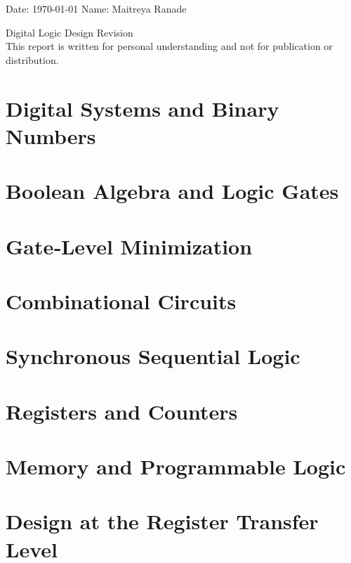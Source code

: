 \documentclass{report}
\begin{document}
\onehalfspacing
	Date: \today{} \hfill{} Name: Maitreya Ranade\\
	\begin{center}
		\vspace*{\fill}
		{\LARGE Digital Logic Design Revision} \\
		This report is written for personal understanding and not for publication or distribution.
		\vspace*{\fill}
	\end{center}
	
\pagebreak
\singlespacing
\tableofcontents
\pagebreak

\chapter{Digital Systems and Binary Numbers}
 \pagebreak

\chapter{Boolean Algebra and Logic Gates}
   \pagebreak

\chapter{Gate‐Level Minimization}
   \pagebreak

\chapter{Combinational Circuits}
   \pagebreak

\chapter{Synchronous Sequential Logic}
   \pagebreak

\chapter{Registers and Counters}
   \pagebreak

\chapter{Memory and Programmable Logic}
   \pagebreak

\chapter{Design at the Register Transfer Level}
   \pagebreak

	
\end{document}

